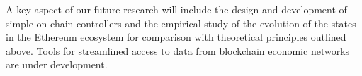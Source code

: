 \documentclass[letterpaper, 10 pt, conference]{ieeeconf}  %
\begin{document}

A key aspect of our future research will include the design and development of simple on-chain controllers and the empirical study of the evolution of the states in the Ethereum ecosystem for comparison with theoretical principles outlined above. Tools for streamlined access to data from blockchain economic networks are under development.



\end{document}
